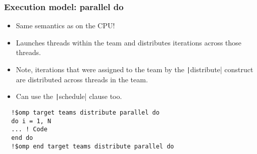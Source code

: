 \documentclass[aspectratio=169]{beamer}
\begin{document}
  \begin{frame}[fragile]
  \frametitle{Execution model: parallel do}
  \begin{itemize}
    \item Same semantics as on the CPU!
    \item Launches threads within the team and distributes iterations across those threads.
    \item Note, iterations that were assigned to the team by the \texttt|distribute| construct are distributed across threads in the team.
    \item Can use the \texttt|schedule| clause too.
  \end{itemize}
  
  \begin{verbatim}
  !$omp target teams distribute parallel do
  do i = 1, N
  ... ! Code
  end do
  !$omp end target teams distribute parallel do
  \end{verbatim}
  \end{frame}
  
\end{document}
